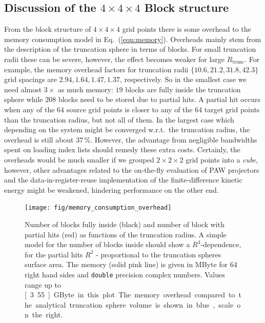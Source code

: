 \documentclass[oribibl]{llncs}
\newcommand{\um}[1]{_{\mathrm{#1}}}
\newcommand{\ttt}[1]{\texttt{#1}}
\begin{document}
\subsection{Discussion of the $4 \times 4 \times 4$ Block structure}
%
From the block structure of $4 \times 4 \times 4$ grid points there is some overhead to the memory consumption model in Eq.~(\ref{eqn:memory}). Overheads mainly stem from the description of the truncation sphere in terms of blocks.
For small truncation radii these can be severe, however, the effect becomes weaker for large $R\um{trunc}$.
For example, the memory overhead factors for truncation radii $\{10.6, 21.2, 31.8, 42.3\}$ grid spacings are ${2.94, 1.64, 1.47, 1.37}$, respectively. So in the smallest case we need almost $3\times$ as much memory: $19$ blocks are fully inside the truncation sphere while $208$ blocks need to be stored due to partial hits. A partial hit occurs when any of the $64$ source grid points is closer to any of the $64$ target grid points than the truncation radius, but not all of them.
In the largest case which depending on the system might be converged w.r.t.~the truncation radius, the overhead is still about $37\,\%$. However, the advantage from negligible bandwidths spent on loading index lists should remedy these extra costs.
Certainly, the overheads would be much smaller if we grouped $2\times 2\times 2$ grid points into a \emph{cube}, however,
other advantages related to the on-the-fly evaluation of \ac{PAW} projectors and the data-in-register-reuse implementation of the finite-difference kinetic energy might be weakened, hindering performance on the other end.

\begin{figure}[t]
	\centering
	\texttt{[image: fig/memory\_consumption\_overhead]}
	\label{fig:memory-consumption-overhead}
	\caption{Number of blocks fully inside (black) and number of block with partial hits (red) as functions of the truncation radius.
	A simple model for the number of blocks inside should show a $R^3$-dependence, for the partial hits $R^2$ - proportional to the truncation spheres surface area. 
	The memory (solid pink line) is given in MByte for 64 right hand sides and \ttt{double} precision complex numbers.
	Values range up to \unit[3.55]{GByte} in this plot.
	The memory overhead compared to the analytical truncation sphere volume is shown in blue, scale on the right.} 
\end{figure}
\end{document}
